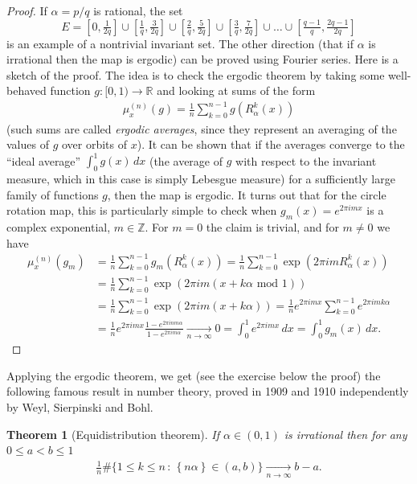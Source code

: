 \documentclass[12pt]{amsart}
\newcommand{\eq}[1]{\begin{equation}\begin{split}#1\end{split}\end{equation}}
\newcommand{\eqst}[1]{\begin{align*}#1\end{align*}}
\newtheorem{thm}{Theorem}
\newcounter{example}
\newcounter{exercise}
\begin{document}
\begin{proof} If $\alpha=p/q$ is rational, the set 
$$ E = \left[0, \tfrac{1}{2q}\right]
\cup \left[\tfrac{1}{q}, \tfrac{3}{2q}\right] 
\cup \left[\tfrac{2}{q}, \tfrac{5}{2q}\right] 
\cup \left[\tfrac{3}{q}, \tfrac{7}{2q}\right] 
\cup \ldots
\cup \left[\tfrac{q-1}{q}, \tfrac{2q-1}{2q}\right]
$$
is an example of a nontrivial invariant set. The other direction (that if $\alpha$ is irrational then the map is ergodic) can be proved using Fourier series. Here is a sketch of the proof. The idea is to check the ergodic theorem by taking some well-behaved function $g:[0,1)\to\mathbb{R}$ and looking at sums of the form
\eqst{ 
\mu_x^{(n)}(g) = \frac{1}{n} \sum_{k=0}^{n-1} g(R_\alpha^k(x))
}
(such sums are called \emph{ergodic averages}, since they represent an averaging of the values of $g$ over orbits of $x$). It can be shown that if the averages converge to the ``ideal average'' $\int_0^1 g(x)\,dx$ (the average of $g$ with respect to the invariant measure, which in this case is simply Lebesgue measure) for a sufficiently large family of functions $g$, then the map is ergodic. It turns out that for the circle rotation map, this is particularly simple to check when $g_m(x)=e^{2\pi i m x}$ is a complex exponential, $m\in\mathbb{Z}$. For $m=0$ the claim is trivial, and for $m\neq 0$ we have 
\eqst{
\mu_x^{(n)}(g_m) &= 
\frac{1}{n} \sum_{k=0}^{n-1} g_m(R_\alpha^k(x)) =%
\frac{1}{n} \sum_{k=0}^{n-1} \exp(2\pi i m R_\alpha^k(x)) \\ &=
\frac{1}{n} \sum_{k=0}^{n-1} \exp(2\pi i m (x+k\alpha \textrm{ mod }1))
\\ &=
\frac{1}{n} \sum_{k=0}^{n-1} \exp(2\pi i m (x+k\alpha))
=%
\frac{1}{n} e^{2\pi i m x} \sum_{k=0}^{n-1} e^{2\pi i m k \alpha}
\\ &=
\frac{1}{n} e^{2\pi i m x} \frac{1-e^{2\pi i n m \alpha}}{1-e^{2\pi i m \alpha}} \xrightarrow[n\to\infty]{}0=\int_0^1 e^{2\pi i m x}\,dx = \int_0^1 g_m(x)\,dx.
}
\end{proof}

Applying the ergodic theorem, we get (see the exercise below the proof) the following famous result in number theory, proved in 1909 and 1910 independently by
Weyl, Sierpinski and Bohl.

\begin{thm}[Equidistribution theorem] If $\alpha\in(0,1)$ is irrational then for any $0\le a<b\le 1$
\eq{ \label{eq:equidistribution1}
\frac{1}{n} \#\Big\{ 1\le k \le n \,:\, \left\{n\alpha\right\} \in (a,b) \Big\} \xrightarrow[n\to\infty]{} b-a.
}
\end{thm}
\end{document}
